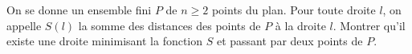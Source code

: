 On se donne un ensemble fini $P$ de $n \geq 2$ points du plan. Pour toute droite $l$, on appelle $S(l)$ la somme des distances des points de $P$ à la droite $l$. Montrer qu'il existe une droite minimisant la fonction $S$ et passant par deux points de $P$.
